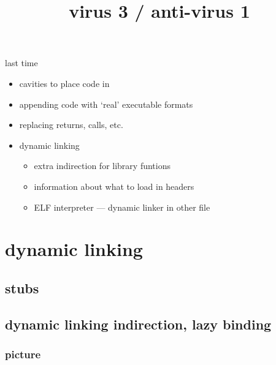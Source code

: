 \graphicspath{{./figures/}}
\title{virus 3 / anti-virus 1}
\date{}
\usepackage{contour}

\begin{frame}
    \titlepage
\end{frame}

\usetikzlibrary{arrows.meta,positioning} %

\begin{frame}{last time}
    \begin{itemize}
        \item cavities to place code in
        \item appending code with `real' executable formats
        \item replacing returns, calls, etc.
        \vspace{.5cm}
        \item dynamic linking
            \begin{itemize}
            \item extra indirection for library funtions
            \item information about what to load in headers
            \item ELF interpreter --- dynamic linker in other file
            \end{itemize}
    \end{itemize}
\end{frame}



\section{dynamic linking}

\subsection{stubs}


\subsection{dynamic linking indirection, lazy binding}
\subsubsection{picture}



